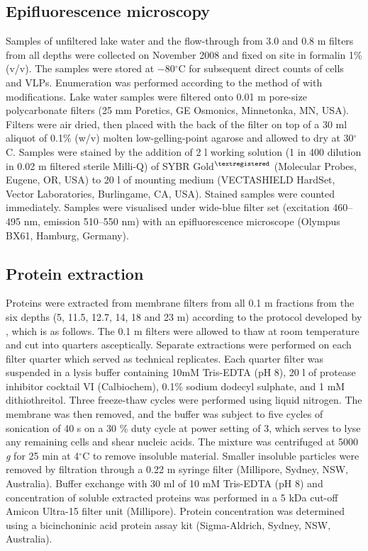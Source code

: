 \subsection{Epifluorescence microscopy}
Samples of unfiltered lake water and the flow-through from 3.0 and 0.8 \textmu{}m filters from all depths were collected on November 2008 and fixed on site in formalin 1\% (v/v). 
The samples were stored at $-$80$^{\circ}$C for subsequent direct counts of cells and \acp{VLP}. 
Enumeration was performed according to the method of \citet{Patel2007} with modifications. 
Lake water samples were filtered onto 0.01 \textmu{}m pore-size polycarbonate filters (25 mm Poretics, \textsc{GE} Osmonics, Minnetonka, \textsc{MN}, \textsc{USA}). 
Filters were air dried, then placed with the back of the filter on top of a 30 ml aliquot of 0.1\% (w/v) molten low-gelling-point agarose and allowed to dry at 30$^{\circ}$C. 
Samples were stained by the addition of 2 \textmu{}l working solution (1 in 400 dilution in 0.02 \textmu{}m filtered sterile Milli-Q) of \textsc{SYBR} Gold$^{\textregistered}$ (Molecular Probes, Eugene, \textsc{OR}, \textsc{USA}) to 20 \textmu{}l of mounting medium (\textsc{VECTASHIELD} HardSet, Vector Laboratories, Burlingame, \textsc{CA}, \textsc{USA}). 
Stained samples were counted immediately.
Samples were visualised under wide-blue filter set (excitation 460--495 nm, emission 510--550 nm) with an epifluorescence microscope (Olympus BX61, Hamburg, Germany).


\subsection{Protein extraction}
Proteins were extracted from membrane filters from all 0.1 \textmu{}m fractions from the six depths (5, 11.5, 12.7, 14, 18 and 23 m) according to the protocol developed by \citet{Ng2010a}, which is as follows.
The 0.1 \textmu{}m filters were allowed to thaw at room temperature and cut into quarters asceptically.
Separate extractions were performed on each filter quarter which served as technical replicates.
Each quarter filter was suspended in a lysis buffer containing 10mM Tris-EDTA (pH 8), 20 \textmu{}l of protease inhibitor cocktail VI (Calbiochem), 0.1\% sodium dodecyl sulphate, and 1 mM dithiothreitol.
Three freeze-thaw cycles were performed using liquid nitrogen.
The membrane was then removed, and the buffer was subject to five cycles of sonication of 40 s on a 30 \% duty cycle at power setting of 3, which serves to lyse any remaining cells and shear nucleic acids.
The mixture was centrifuged at 5000 \emph{g} for 25 min at 4$^{\circ}$C to remove insoluble material.
Smaller insoluble particles were removed by filtration through a 0.22 \textmu{}m syringe filter (Millipore, Sydney, NSW, Australia).
Buffer exchange with 30 ml of 10 mM Tris-EDTA (pH 8) and concentration of soluble extracted proteins was performed in a 5 kDa cut-off Amicon Ultra-15 filter unit (Millipore).
Protein concentration was determined using a bicinchoninic acid protein assay kit (Sigma-Aldrich, Sydney, NSW, Australia).


